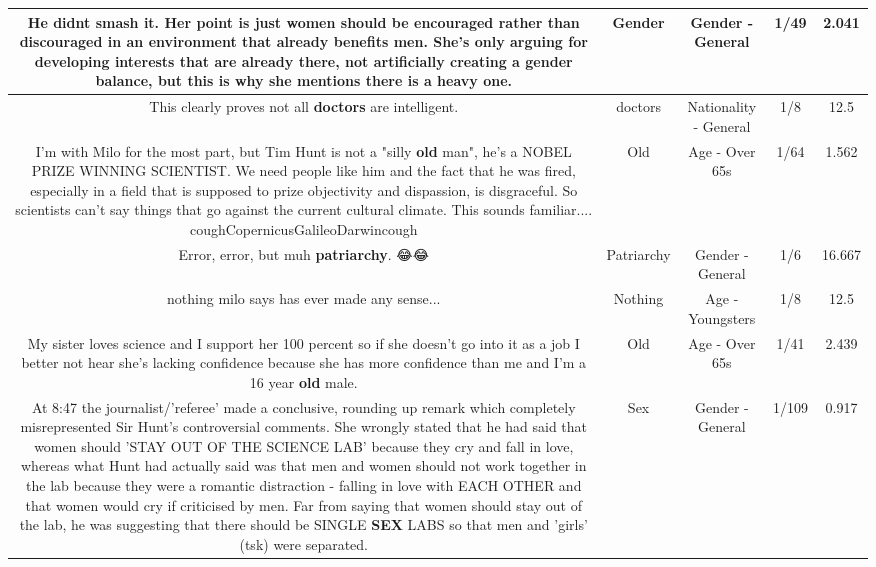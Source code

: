 \documentclass[11pt]{article}
\newlength\mylength
\begin{document}
\begin{center}
\begin{longtable}{|C{.65\mylength}|C{.30\mylength}|C{.12\mylength}|C{.12\mylength}|C{.12\mylength}|}
  \small He didnt smash it. Her point is just women should be encouraged rather than discouraged in an environment that already benefits men. She's only arguing for developing interests that are already there, not artificially creating a \textbf{gender} balance, but this is why she mentions there is a heavy one.\normalsize   & Gender & Gender - General & 1/49 & 2.041 \\  \hline
  \small This clearly proves not all \textbf{doctors} are intelligent.\normalsize   & doctors & Nationality - General & 1/8 & 12.5 \\  \hline
  \small I'm with Milo for the most part, but Tim Hunt is not a "silly \textbf{old} man", he's a NOBEL PRIZE WINNING SCIENTIST. We need people like him and the fact that he was fired, especially in a field that is supposed to prize objectivity and dispassion, is disgraceful. So scientists can't say things that go against the current cultural climate. This sounds familiar.... coughCopernicusGalileoDarwincough\normalsize   & Old & Age - Over 65s & 1/64 & 1.562 \\  \hline
  \small Error, error, but muh \textbf{patriarchy}. 😂😂\normalsize   & Patriarchy & Gender - General & 1/6 & 16.667 \\  \hline
  \small nothing milo says has ever made any sense...\normalsize   & Nothing & Age - Youngsters & 1/8 & 12.5 \\  \hline
  \small My sister loves science and I support her 100 percent so if she doesn't go into it as a job I better not hear she's lacking confidence because she has more confidence than me and I'm a 16 year \textbf{old} male.\normalsize   & Old & Age - Over 65s & 1/41 & 2.439 \\  \hline
  \small At 8:47 the journalist/'referee' made a conclusive, rounding up remark which completely misrepresented  Sir Hunt's controversial comments. She wrongly stated that he had said that women should 'STAY OUT OF THE SCIENCE LAB' because they cry and fall in love, whereas what Hunt had actually said was that men and women should not work together in the lab because they were a romantic distraction - falling in love with EACH OTHER and that women would cry if criticised by men. Far from saying that women should stay out of the lab, he was suggesting that there should be SINGLE \textbf{SEX} LABS so that men and 'girls' (tsk) were separated.\normalsize   & Sex & Gender - General & 1/109 & 0.917 \\  \hline

\end{longtable}
\end{center}
\end{document}
